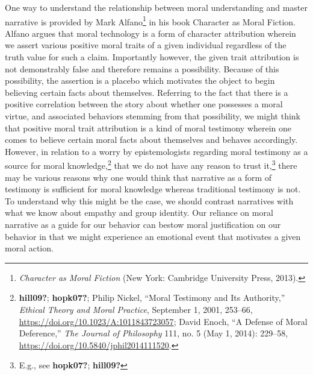 \documentclass[
  12pt,
]{book}
\theoremstyle{definition}
\theoremstyle{definition}
\theoremstyle{definition}
\theoremstyle{definition}
\theoremstyle{remark}
\begin{document}
One way to understand the relationship between moral understanding and master narrative is provided by Mark Alfano\footnote{\emph{Character as Moral Fiction} (New York: Cambridge University Press, 2013).} in his book Character as Moral Fiction. Alfano argues that moral technology is a form of character attribution wherein we assert various positive moral traits of a given individual regardless of the truth value for such a claim. Importantly however, the given trait attribution is not demonstrably false and therefore remains a possibility. Because of this possibility, the assertion is a placebo which motivates the object to begin believing certain facts about themselves. Referring to the fact that there is a positive correlation between the story about whether one possesses a moral virtue, and associated behaviors stemming from that possibility, we might think that positive moral trait attribution is a kind of moral testimony wherein one comes to believe certain moral facts about themselves and behaves accordingly. However, in relation to a worry by epistemologists regarding moral testimony as a source for moral knowledge,\footnote{\textbf{hill09?}; \textbf{hopk07?}; Philip Nickel, {``Moral {Testimony} and Its {Authority},''} \emph{Ethical Theory and Moral Practice}, September 1, 2001, 253--66, \url{https://doi.org/10.1023/A:1011843723057}; David Enoch, {``A {Defense} of {Moral Deference},''} \emph{The Journal of Philosophy} 111, no. 5 (May 1, 2014): 229--58, \url{https://doi.org/10.5840/jphil2014111520}.} that we do not have any reason to trust it,\footnote{E.g., see \textbf{hopk07?}; \textbf{hill09?}} there may be various reasons why one would think that narrative as a form of testimony is sufficient for moral knowledge whereas traditional testimony is not. To understand why this might be the case, we should contrast narratives with what we know about empathy and group identity. Our reliance on moral narrative as a guide for our behavior can bestow moral justification on our behavior in that we might experience an emotional event that motivates a given moral action.
\end{document}
